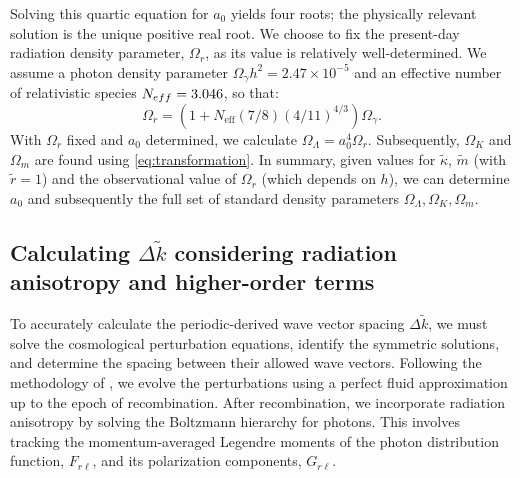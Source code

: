 Solving this quartic equation for $a_0$ yields four roots; the physically relevant solution is the unique positive real root.
We choose to fix the present-day radiation density parameter, $\Omega_r$, as its value is relatively well-determined. We assume a photon density parameter $\Omega_\gamma h^2 = 2.47\times 10^{-5}$ and an effective number of relativistic species $N_{\mathrm\mathrm{eff}}=3.046$, so that: %
\begin{equation}
    \Omega_r= (1 + N_{\mathrm{eff}}(7/8)(4/11)^{4/3} ) \Omega_\gamma.
\end{equation}
With $\Omega_r$ fixed and $a_0$ determined, we calculate $\Omega_\Lambda=a_0^4\Omega_r$. Subsequently, $\Omega_K$ and $\Omega_m$ are found using \eqref{eq:transformation}. %
In summary, given values for $\tilde \kappa$, $\tilde m$ (with $\tilde r=1$) and the observational value of $\Omega_r$ (which depends on $h$), we can determine $a_0$ and subsequently the full set of standard density parameters $\Omega_\Lambda, \Omega_K, \Omega_m$.

\subsection{Calculating $\Delta \tilde k$ considering radiation anisotropy and higher-order terms} %

To accurately calculate the periodic-derived wave vector spacing $\Delta \tilde k$, we must solve the cosmological perturbation equations, identify the symmetric solutions, and determine the spacing between their allowed wave vectors. %
Following the methodology of \cite{2022PhRvD.105h3515B}, we evolve the perturbations using a perfect fluid approximation up to the epoch of recombination. After recombination, we incorporate radiation anisotropy by solving the Boltzmann hierarchy for photons. This involves tracking the momentum-averaged Legendre moments of the photon distribution function, $F_{r\ell}$, and its polarization components, $G_{r\ell}$. %

